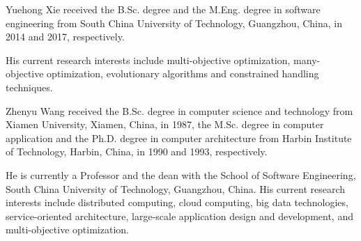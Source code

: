 \documentclass[10pt, journal]{IEEEtran}
\begin{document}
\begin{IEEEbiography}{Yuehong Xie}
		received the B.Sc. degree and the M.Eng. degree in software engineering
        from South China University of Technology, Guangzhou, China, in 2014 and
        2017, respectively.
		
		His current research interests include multi-objective optimization, many-objective optimization, evolutionary algorithms
		and constrained handling techniques.
	\end{IEEEbiography}
	
\begin{IEEEbiography}{Zhenyu Wang}
        received the B.Sc. degree in computer science and technology from
		Xiamen University, Xiamen, China, in 1987, the M.Sc. degree in computer application
		and the Ph.D. degree in computer architecture from Harbin Institute of Technology, Harbin, China, in 1990 and 1993, respectively.		

        He is currently a Professor and the dean with the School of Software Engineering, South China University of Technology, Guangzhou, China.		
		His current research interests include distributed
        computing, cloud computing, big data technologies, service-oriented architecture, large-scale application design and development, and multi-objective optimization.
	\end{IEEEbiography}
\end{document}
